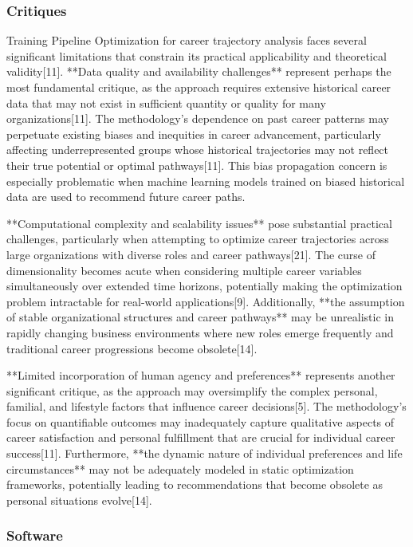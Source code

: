 \documentclass[main.tex]{subfiles}
\begin{document}
\subsubsection{Critiques}

Training Pipeline Optimization for career trajectory analysis faces several significant limitations that constrain its practical applicability and theoretical validity[11]. **Data quality and availability challenges** represent perhaps the most fundamental critique, as the approach requires extensive historical career data that may not exist in sufficient quantity or quality for many organizations[11]. The methodology's dependence on past career patterns may perpetuate existing biases and inequities in career advancement, particularly affecting underrepresented groups whose historical trajectories may not reflect their true potential or optimal pathways[11]. This bias propagation concern is especially problematic when machine learning models trained on biased historical data are used to recommend future career paths.

**Computational complexity and scalability issues** pose substantial practical challenges, particularly when attempting to optimize career trajectories across large organizations with diverse roles and career pathways[21]. The curse of dimensionality becomes acute when considering multiple career variables simultaneously over extended time horizons, potentially making the optimization problem intractable for real-world applications[9]. Additionally, **the assumption of stable organizational structures and career pathways** may be unrealistic in rapidly changing business environments where new roles emerge frequently and traditional career progressions become obsolete[14].

**Limited incorporation of human agency and preferences** represents another significant critique, as the approach may oversimplify the complex personal, familial, and lifestyle factors that influence career decisions[5]. The methodology's focus on quantifiable outcomes may inadequately capture qualitative aspects of career satisfaction and personal fulfillment that are crucial for individual career success[11]. Furthermore, **the dynamic nature of individual preferences and life circumstances** may not be adequately modeled in static optimization frameworks, potentially leading to recommendations that become obsolete as personal situations evolve[14].

\subsubsection{Software}
\end{document}
